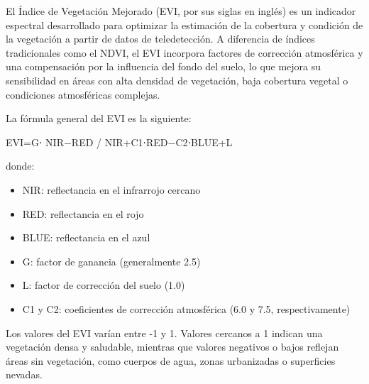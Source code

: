 \documentclass[
]{book}
\providecommand{\tightlist}{%
  \setlength{\itemsep}{0pt}\setlength{\parskip}{0pt}}
\begin{document}
El Índice de Vegetación Mejorado (EVI, por sus siglas en inglés) es un indicador espectral desarrollado para optimizar la estimación de la cobertura y condición de la vegetación a partir de datos de teledetección. A diferencia de índices tradicionales como el NDVI, el EVI incorpora factores de corrección atmosférica y una compensación por la influencia del fondo del suelo, lo que mejora su sensibilidad en áreas con alta densidad de vegetación, baja cobertura vegetal o condiciones atmosféricas complejas.

La fórmula general del EVI es la siguiente:

EVI=G⋅ NIR−RED / NIR+C1\hspace{0pt}⋅RED−C2\hspace{0pt}⋅BLUE+L

donde:

\begin{itemize}
\tightlist
\item
  NIR: reflectancia en el infrarrojo cercano\\
\item
  RED: reflectancia en el rojo\\
\item
  BLUE: reflectancia en el azul\\
\item
  G: factor de ganancia (generalmente 2.5)\\
\item
  L: factor de corrección del suelo (1.0)\\
\item
  C1 y C2\hspace{0pt}: coeficientes de corrección atmosférica (6.0 y 7.5, respectivamente)
\end{itemize}

Los valores del EVI varían entre -1 y 1. Valores cercanos a 1 indican una vegetación densa y saludable, mientras que valores negativos o bajos reflejan áreas sin vegetación, como cuerpos de agua, zonas urbanizadas o superficies nevadas.
\end{document}
